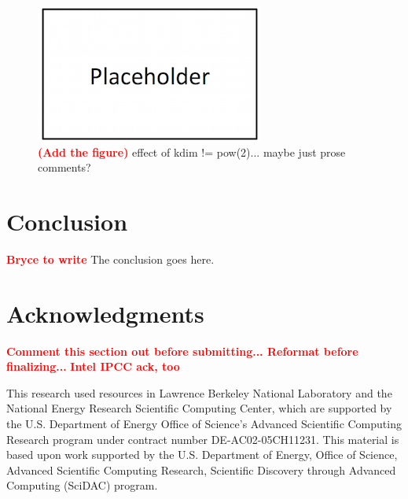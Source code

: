 \documentclass[conference]{IEEEtran}
\newcommand{\fix}[1]{{\bf \textcolor {red}{#1}}}
\begin{document}
\begin{figure}%
\centering
\includegraphics[width=0.9\columnwidth]{figures/placeholder.png}
\caption{\fix{(Add the figure)} 
effect of kdim != pow(2)... maybe just prose comments?  }
\end{figure}


\section{Conclusion}
\fix{Bryce to write}
The conclusion goes here.


\section*{Acknowledgments}
\fix{Comment this section out before submitting... Reformat before finalizing...}
\fix{Intel IPCC ack, too}

This research used resources in Lawrence Berkeley National Laboratory and the National Energy Research Scientific Computing Center, which are supported by the U.S. Department of Energy Office of Science's Advanced Scientific Computing Research program under contract number DE-AC02-05CH11231.  
This material is based upon work supported by the U.S. Department of Energy, Office of Science, Advanced Scientific Computing Research, Scientific Discovery through Advanced Computing (SciDAC) program.
\end{document}
